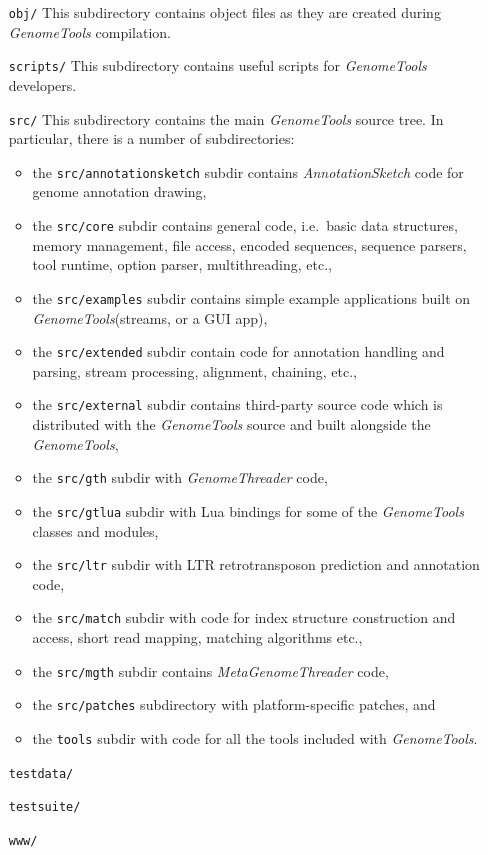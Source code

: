 \documentclass[11pt,final]{article}
\newcommand{\Gt}[0]{\emph{GenomeTools}\xspace}
\begin{document}
\begin{itemize}
     This subdirectory contains the \Gt static and dynamic libraries when built.
\item[\texttt{obj/}]
     This subdirectory contains object files as they are created during \Gt
     compilation.
\item[\texttt{scripts/}]
     This subdirectory contains useful scripts for \Gt developers.
\item[\texttt{src/}]
     This subdirectory contains the main \Gt source tree. In particular, there
     is a number of subdirectories:
     \begin{itemize}
       \item the \texttt{src/annotationsketch} subdir contains
             \emph{AnnotationSketch} code for genome annotation drawing,
       \item the \texttt{src/core} subdir contains general code, i.e.\
             basic data structures, memory management, file access, encoded
             sequences, sequence parsers, tool runtime, option parser,
             multithreading, etc.,
       \item the \texttt{src/examples} subdir contains simple example
             applications built on \Gt (streams, or a GUI app),
       \item the \texttt{src/extended} subdir contain code for annotation
             handling and parsing, stream processing, alignment, chaining, etc.,
       \item the \texttt{src/external} subdir contains third-party source code
             which is distributed with the \Gt source and built alongside the
             \Gt ,
       \item the \texttt{src/gth} subdir with \emph{GenomeThreader} code,
       \item the \texttt{src/gtlua} subdir with Lua bindings for some of the \Gt
             classes and modules,
       \item the \texttt{src/ltr} subdir with LTR retrotransposon prediction and
             annotation code,
       \item the \texttt{src/match} subdir with code for index structure
             construction and access, short read mapping, matching algorithms
             etc.,
       \item the \texttt{src/mgth} subdir contains \emph{MetaGenomeThreader}
             code,
       \item the \texttt{src/patches} subdirectory with platform-specific
             patches, and
       \item the \texttt{tools} subdir with code for all the tools included with
             \Gt .
     \end{itemize}     
\item[\texttt{testdata/}]
\item[\texttt{testsuite/}]
\item[\texttt{www/}]
\end{itemize}
\end{document}
